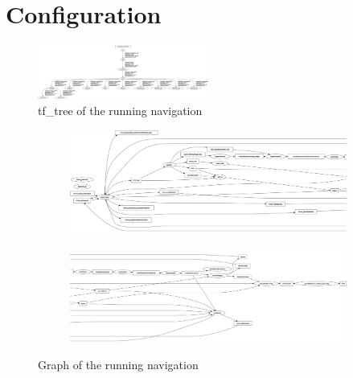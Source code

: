 \chapter{Configuration}
\label{config}

\begin{figure}[H]
	\centering
	\includegraphics[angle=90, width=0.5\textwidth]{Pictures/tf tree}
	\caption{tf\_tree of the running navigation}
 	\label{tftree concept}
\end{figure}


\begin{figure} 
	\centering
	\begin{subfigure}{.45\textwidth}
		\includegraphics[angle=90, width=\linewidth]{Pictures/rosgraphleft}
	\end{subfigure}
	\begin{subfigure}{.45\textwidth}
		\includegraphics[angle=90, width=\linewidth]{Pictures/rosgraphright}
	\end{subfigure}
	\caption{Graph of the running navigation}
	
 	\label{graph concept}
\end{figure}
